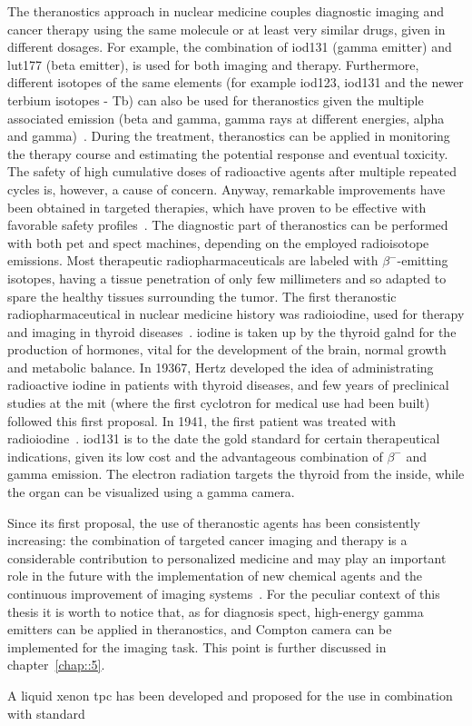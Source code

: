The theranostics approach in nuclear medicine couples diagnostic imaging and cancer therapy using the same molecule or at least very similar drugs, given in different dosages. For example, the combination of \gls{iod131} (gamma emitter) and \gls{lut177} (beta emitter), is used for both imaging and therapy. Furthermore, different isotopes of the same elements (for example \gls{iod123}, \gls{iod131} and the newer terbium isotopes - Tb) can also be used for theranostics given the multiple associated emission (beta and gamma, gamma rays at different energies, alpha and gamma)~\parencite{Gerard2002, Alzahrani2012, Muller2012}. During the treatment, theranostics can be applied in monitoring the therapy course and estimating the potential response and eventual toxicity. The safety of high cumulative doses of radioactive agents after multiple repeated cycles is, however, a cause of concern. Anyway, remarkable improvements have been obtained in targeted therapies, which have proven to be effective with favorable safety profiles~\parencite{Baum2012, Kwekkeboom2008, Strosberg2017}. The diagnostic part of theranostics can be performed with both \gls{pet} and \gls{spect} machines, depending on the employed radioisotope emissions. Most therapeutic radiopharmaceuticals are labeled with $\beta^{-}$-emitting isotopes, having a tissue penetration of only few millimeters and so adapted to spare the healthy tissues surrounding the tumor. The first theranostic radiopharmaceutical in nuclear medicine history was radioiodine, used for therapy and imaging in thyroid diseases~\parencite{Hertz2016}. iodine is taken up by the thyroid galnd for the production of hormones, vital for the development of the brain, normal growth and metabolic balance. In 19367, Hertz developed the idea of administrating radioactive iodine in patients with thyroid diseases, and few years of preclinical studies at the \gls{mit} (where the first cyclotron for medical use had been built) followed this first proposal. In 1941, the first patient was treated with radioiodine~\parencite{Hertz1942}. \gls{iod131} is to the date the gold standard for certain therapeutical indications, given its low cost and the advantageous combination of $\beta^{-}$ and gamma emission. The electron radiation targets the thyroid from the inside, while the organ can be visualized using a gamma camera.  

Since its first proposal, the use of theranostic agents has been consistently increasing: the combination of targeted cancer imaging and therapy is a considerable contribution to personalized medicine and may play an important role in the future with the implementation of new chemical agents and the continuous improvement of imaging systems~\parencite{Yordanova2017}. For the peculiar context of this thesis it is worth to notice that, as for diagnosis \gls{spect}, high-energy gamma emitters can be applied in theranostics, and Compton camera can be implemented for the imaging task. This point is further discussed in chapter~\ref{chap::5}. 


A liquid xenon \gls{tpc} has been developed and proposed for the use in combination with standard \parencite{Oger2012}

\clearpage

